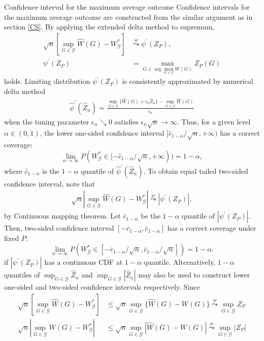 \documentclass[12pt,oneside,reqno,english]{amsart}
\makeatletter
\renewcommand\subsubsection{\@startsection{subsubsection}{3}%
  \z@{.5\linespacing\@plus.7\linespacing}{-.5em}%
  {\normalfont\scshape}}
\theoremstyle{definition}
\makeatother
\begin{document}
\subsubsection{Confidence interval for the maximum average outcome}
Confidence intervals for the maximum average outcome are constructed from the similar argument as in section \ref{CS}. 
By applying the extended delta method to supremum, 
\begin{align}
\sqrt{n}\left[\sup_{G\in \mathcal{G}}\hat{W}(G)-W^{*}_{\mathcal{G}}\right]
&\overset{w}{\underset{}{\leadsto}}\psi^{\prime}(Z_{P}),\label{eq:limdist1}\\
\psi^{\prime}(Z_{P})&=\max_{G\in \arg\max_{G\in \mathcal{G}}W(G)}Z_{P}(G)\nonumber
\end{align}
holds. Limiting distribution $\psi^{\prime}(Z_{P})$ is consistently approximated by numerical delta method 
\begin{align*}
\hat{\psi}^{\prime}(\hat{Z}_{n})=\frac{\sup_{G\in \mathcal{G}}\{\hat{W}(G)+\epsilon_{n}\hat{Z}_{n}\}-\sup_{G\in \mathcal{G}}\hat{W}(G)}{\epsilon_{n}}
\end{align*} 
when the tuning parameter $\epsilon_{n}\searrow 0$ satisfies $\epsilon_{n}\sqrt{n}\rightarrow \infty$. 
Thus, for a given level $\alpha\in (0,1)$, the lower one-sided confidence interval $[\hat{c}_{1-\alpha}/\sqrt{n}, +\infty)$ has a correct coverage:
\[\lim_{n\rightarrow \infty} P(W^{*}_{\mathcal{G}}\in [-\hat{c}_{1-\alpha}/\sqrt{n}, +\infty ))=1-\alpha,\]
where $\hat{c}_{1-\alpha}$ is the $1-\alpha$ quantile of $\hat{\psi}^{\prime}(\hat{Z}_{n})$. 
To obtain equal tailed two-sided confidence interval, note that
\begin{align}
\sqrt{n}\left|\sup_{G\in \mathcal{G}}\hat{W}(G)-W^{*}_{\mathcal{G}}\right| 
\overset{w}{\underset{}{\leadsto}}\left| \psi^{\prime}(Z_{P})\right|,\label{eq:limdist2}
\end{align}
by Continuous mapping theorem. Let $\bar{c}_{1-\alpha}$ be the $1-\alpha$ quantile of $|\psi^{\prime}(Z_{P})|$.  
Then, two-sided confidence interval $[-\bar{c}_{1-\alpha},\bar{c}_{1-\alpha}]$ has a correct coverage under fixed $P$:
\[\lim_{n\rightarrow \infty} P(W^{*}_{\mathcal{G}}\in [-\bar{c}_{1-\alpha}/\sqrt{n},\bar{c}_{1-\alpha}/\sqrt{n}])=1-\alpha.\]
if $|\psi^{\prime}(Z_{P})|$ has a continuous CDF at $1-\alpha$ quantile.
Alternatively, $1-\alpha$ quantiles of $\sup_{G\in \mathcal{G}}\hat{Z}_{n}$ and $\sup_{G\in \mathcal{G}}|\hat{Z}_{n}|$ may also be used 
to construct lower one-sided and two-sided confidence intervals respectively. Since 
\begin{align*}
\sqrt{n}\left[\sup_{G\in \mathcal{G}}\hat{W}(G)-W^{*}_{\mathcal{G}}\right]&\leq \sqrt{n}\sup_{G\in \mathcal{G}}\{\hat{W}(G)-W(G)\}\overset{w}{\underset{}{\leadsto}} \sup_{G\in \mathcal{G}}Z_{P}\\
\sqrt{n}\left|\sup_{G\in \mathcal{G}}\hat{W}(G)-W^{*}_{\mathcal{G}}\right|&\leq \sqrt{n}\sup_{G\in \mathcal{G}}|\hat{W}(G)-W(G)|\overset{w}{\underset{}{\leadsto}} \sup_{G\in \mathcal{G}}|Z_{P}|
\end{align*}
\end{document}
